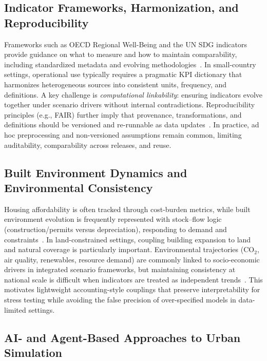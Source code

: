 \documentclass[urbansci,article,submit,pdftex,moreauthors]{Definitions/mdpi}
\begin{document}
\subsection{Indicator Frameworks, Harmonization, and Reproducibility}

Frameworks such as OECD Regional Well-Being and the UN SDG indicators provide
guidance on what to measure and how to maintain comparability, including
standardized metadata and evolving
methodologies~\cite{oecdregionalwellbeing,unstatsSDGmetadata}. In small-country
settings, operational use typically requires a pragmatic KPI dictionary that
harmonizes heterogeneous sources into consistent units, frequency, and
definitions. A key challenge is \emph{computational linkability}: ensuring
indicators evolve together under scenario drivers without internal
contradictions. Reproducibility principles (e.g., FAIR) further imply that
provenance, transformations, and definitions should be versioned and
re-runnable as data updates~\cite{wilkinson2016fair}. In practice, ad hoc
preprocessing and non-versioned assumptions remain common, limiting
auditability, comparability across releases, and reuse.

\subsection{Built Environment Dynamics and Environmental Consistency}

Housing affordability is often tracked through cost-burden metrics, while built
environment evolution is frequently represented with stock--flow logic
(construction/permits versus depreciation), responding to demand and
constraints~\cite{eurostatHousingCostOverburden}. In land-constrained settings,
coupling building expansion to land and natural coverage is particularly
important. Environmental trajectories (CO$_2$, air quality, renewables, resource
demand) are commonly linked to socio-economic drivers in integrated scenario
frameworks, but maintaining consistency at national scale is difficult when
indicators are treated as independent trends~\cite{riahi2017ssps}. This
motivates lightweight accounting-style couplings that preserve interpretability
for stress testing while avoiding the false precision of over-specified models
in data-limited settings.

\subsection{AI- and Agent-Based Approaches to Urban Simulation}
\end{document}
